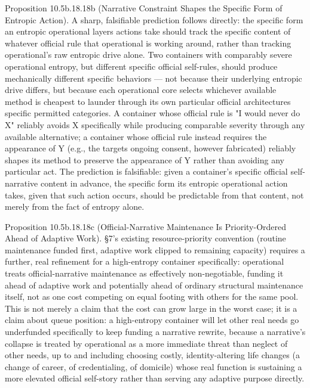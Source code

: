 \documentclass[
]{article}
\begin{document}
Proposition 10.5b.18.18b (Narrative Constraint Shapes the Specific Form
of Entropic Action). A sharp, falsifiable prediction follows directly:
the specific form an entropic operational layers actions take should
track the specific content of whatever official rule that operational is
working around, rather than tracking operational's raw entropic drive
alone. Two containers with comparably severe operational entropy, but
different specific official self-rules, should produce mechanically
different specific behaviors --- not because their underlying entropic
drive differs, but because each operational core selects whichever
available method is cheapest to launder through its own particular
official architectures specific permitted categories. A container whose
official rule is "I would never do X" reliably avoids X specifically
while producing comparable severity through any available alternative; a
container whose official rule instead requires the appearance of Y
(e.g., the targets ongoing consent, however fabricated) reliably shapes
its method to preserve the appearance of Y rather than avoiding any
particular act. The prediction is falsifiable: given a container's
specific official self-narrative content in advance, the specific form
its entropic operational action takes, given that such action occurs,
should be predictable from that content, not merely from the fact of
entropy alone.

Proposition 10.5b.18.18c (Official-Narrative Maintenance Is
Priority-Ordered Ahead of Adaptive Work). §7's existing
resource-priority convention (routine maintenance funded first, adaptive
work clipped to remaining capacity) requires a further, real refinement
for a high-entropy container specifically: operational treats
official-narrative maintenance as effectively non-negotiable, funding it
ahead of adaptive work and potentially ahead of ordinary structural
maintenance itself, not as one cost competing on equal footing with
others for the same pool. This is not merely a claim that the cost can
grow large in the worst case; it is a claim about queue position: a
high-entropy container will let other real needs go underfunded
specifically to keep funding a narrative rewrite, because a narrative's
collapse is treated by operational as a more immediate threat than
neglect of other needs, up to and including choosing costly,
identity-altering life changes (a change of career, of credentialing, of
domicile) whose real function is sustaining a more elevated official
self-story rather than serving any adaptive purpose directly.
\end{document}
